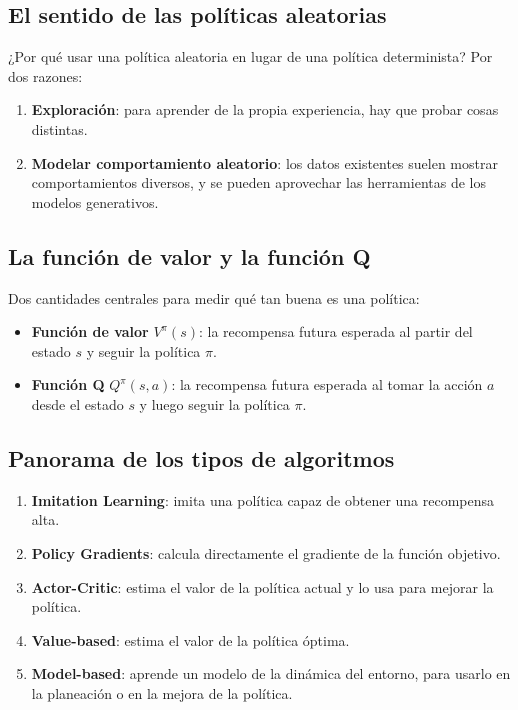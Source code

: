 \documentclass[a4paper]{article}
\begin{document}
\subsection{El sentido de las políticas aleatorias}

¿Por qué usar una política aleatoria en lugar de una política determinista? Por dos razones:
\begin{enumerate}
    \item \textbf{Exploración}: para aprender de la propia experiencia, hay que probar cosas distintas.
    \item \textbf{Modelar comportamiento aleatorio}: los datos existentes suelen mostrar comportamientos diversos, y se pueden aprovechar las herramientas de los modelos generativos.
\end{enumerate}

\subsection{La función de valor y la función Q}

Dos cantidades centrales para medir qué tan buena es una política:

\begin{itemize}
    \item \textbf{Función de valor} $V^\pi(s)$: la recompensa futura esperada al partir del estado $s$ y seguir la política $\pi$.
    \item \textbf{Función Q} $Q^\pi(s, a)$: la recompensa futura esperada al tomar la acción $a$ desde el estado $s$ y luego seguir la política $\pi$.
\end{itemize}

\subsection{Panorama de los tipos de algoritmos}

\begin{enumerate}
    \item \textbf{Imitation Learning}: imita una política capaz de obtener una recompensa alta.
    \item \textbf{Policy Gradients}: calcula directamente el gradiente de la función objetivo.
    \item \textbf{Actor-Critic}: estima el valor de la política actual y lo usa para mejorar la política.
    \item \textbf{Value-based}: estima el valor de la política óptima.
    \item \textbf{Model-based}: aprende un modelo de la dinámica del entorno, para usarlo en la planeación o en la mejora de la política.
\end{enumerate}
\end{document}
